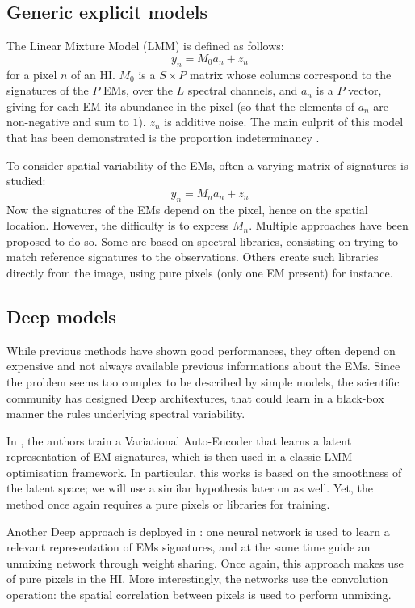 \documentclass{article}
\begin{document}
\subsection{Generic explicit models}
The Linear Mixture Model (LMM) is defined as follows:
$$y_n = M_0 a_n + z_n$$
for a pixel $n$ of an HI. $M_0$ is a $S \times P$ matrix whose columns correspond to the signatures of the $P$ EMs, over the $L$ spectral channels, and $a_n$ is a $P$ vector, giving for each EM its abundance in the pixel (so that the elements of $a_n$ are non-negative and sum to $1$). $z_n$ is additive noise. The main culprit of this model that has been demonstrated is the proportion indeterminancy \citep{borsoi_spectral_2020}.

To consider spatial variability of the EMs, often a varying matrix of signatures is studied:
\begin{equation}\label{eq:LMM}
  y_n = M_n a_n + z_n
\end{equation}
Now the signatures of the EMs depend on the pixel, hence on the spatial location. However, the difficulty is to express $M_n$. Multiple approaches have been proposed to do so. Some are based on spectral libraries, consisting on trying to match reference signatures to the observations. Others create such libraries directly from the image, using pure pixels (only one EM present) for instance.

\subsection{Deep models}
While previous methods have shown good performances, they often depend on expensive and not always available previous informations about the EMs. Since the problem seems too complex to be described by simple models, the scientific community has designed Deep architextures, that could learn in a black-box manner the rules underlying spectral variability.

In \citet{borsoi_deep_2019}, the authors train a Variational Auto-Encoder that learns a latent representation of EM signatures, which is then used in a classic LMM optimisation framework. In particular, this works is based on the smoothness of the latent space; we will use a similar hypothesis later on as well. Yet, the method once again requires a pure pixels or libraries for training.

Another Deep approach is deployed in \citet{hong_endmember-guided_2021}: one neural network is used to learn a relevant representation of EMs signatures, and at the same time guide an unmixing network through weight sharing. Once again, this approach makes use of pure pixels in the HI. More interestingly, the networks use the convolution operation: the spatial correlation between pixels is used to perform unmixing.
\end{document}

